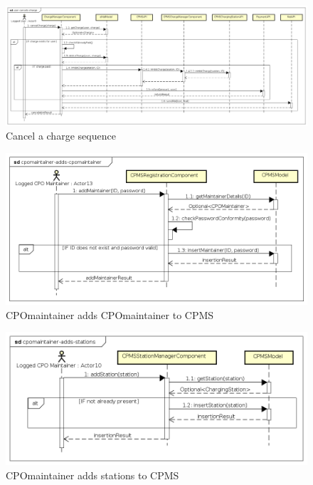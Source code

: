 \begin{figure}[!h]
    \begin{center}
        \includegraphics[keepaspectratio, width=16cm]{Sequence/user-cancels-charge.png}
        \caption{Cancel a charge sequence}
        \label{fig:user-cancels-charge}
    \end{center}
\end{figure}
\begin{figure}[!h]
    \begin{center}
        \includegraphics[keepaspectratio, width=16cm]{Sequence/cpomaintainer-adds-cpomaintainer.png}
        \caption{\ac{CPO}maintainer adds \ac{CPO}maintainer to \ac{CPMS}}
        \label{fig:cpomaintainer-adds-cpomaintainer}
    \end{center}
\end{figure}
\begin{figure}[!h]
    \begin{center}
        \includegraphics[keepaspectratio, width=16cm]{Sequence/cpomaintainer-adds-stations.png}
        \caption{\ac{CPO}maintainer adds stations to \ac{CPMS}}
        \label{fig:cpomaintainer-adds-stations}
    \end{center}
\end{figure}
